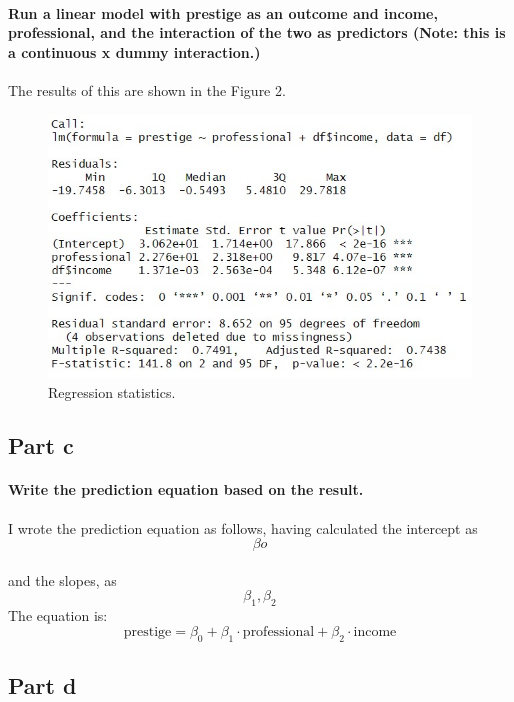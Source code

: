 \documentclass{article}
\begin{document}
	\paragraph{Run a linear model with prestige as an outcome and income, professional, and the interaction of the two as predictors (Note: this is a continuous x dummy interaction.)}
	The results of this are shown in the Figure 2. 
	\begin{figure}[h!]
		\centering
		\includegraphics[width=0.9\linewidth]{Regression statistical model.jpg}
		\caption{Regression statistics.}
		\label{fig:Regression statistics.}
	\end{figure}
	\subsection{Part c}
	\paragraph{Write the prediction equation based on the result.}
	I wrote the prediction equation as follows, having calculated the intercept as 
	\begin{equation}
		\beta o
	\end{equation} 
	\paragraph{}and the slopes, as 
	\begin{equation}
		\beta_1 , \beta_2
	\end{equation}The equation is:
	\begin{equation}
		\text{prestige} = \beta_0 + \beta_1 \cdot \text{professional} + \beta_2 \cdot \text{income}
	\end{equation}
	\subsection{Part d}
\end{document}
